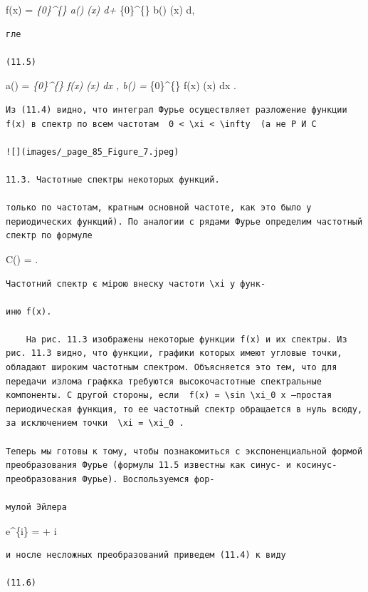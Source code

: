 \documentclass[
  ukrainian,
]{article}
\begin{document}
f(x) = \int\emph{\{0\}\^{}\{\infty\} a(\xi) \cos(\xi x) d\xi +
\int}\{0\}\^{}\{\infty\} b(\xi) \sin(\xi x) d\xi,

\begin{verbatim}
гле

(11.5)
\end{verbatim}

a(\xi) =  \int\emph{\{0\}\^{}\{\infty\} f(x) \cos(\xi x) dx
, b(\xi) =  \int}\{0\}\^{}\{\infty\} f(x) \sin(\xi x) dx .

\begin{verbatim}
Из (11.4) видно, что интеграл Фурье осуществляет разложение функции f(x) в спектр по всем частотам  0 < \xi < \infty  (а не Р И С

![](images/_page_85_Figure_7.jpeg)

11.3. Частотные спектры некоторых функций.

только по частотам, кратным основной частоте, как это было у периодических функций). По аналогии с рядами Фурье определим частотный спектр по формуле
\end{verbatim}

C(\xi) = .

\begin{verbatim}
Частотний спектр є мірою внеску частоти \xi у функ-

иню f(x).

    На рис. 11.3 изображены некоторые функции f(x) и их спектры. Из рис. 11.3 видно, что функции, графики которых имеют угловые точки, обладают широким частотным спектром. Объясняется это тем, что для передачи излома графкка требуются высокочастотные спектральные компоненты. С другой стороны, если  f(x) = \sin \xi_0 x —простая периодическая функция, то ее частотный спектр обращается в нуль всюду, за исключением точки  \xi = \xi_0 .

Теперь мы готовы к тому, чтобы познакомиться с экспоненциальной формой преобразования Фурье (формулы 11.5 известны как синус- и косинус-преобразования Фурье). Воспользуемся фор-

мулой Эйлера
\end{verbatim}

e\^{}\{i\theta\} = \cos \theta + i \sin \theta

\begin{verbatim}
и носле несложных преобразований приведем (11.4) к виду

(11.6)
\end{verbatim}
\end{document}
